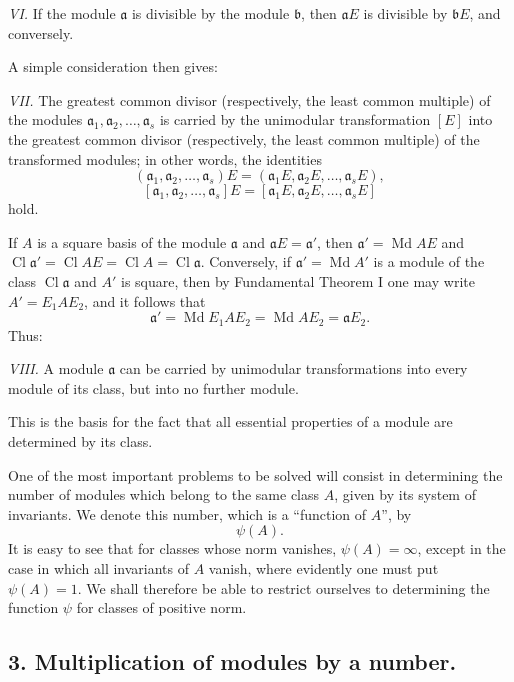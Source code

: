\documentclass[11pt,a4paper]{article}
\newcommand{\Cl}{\operatorname{Cl}}
\newcommand{\Md}{\operatorname{Md}}
\begin{document}
\emph{VI.} If the module $\mathfrak a$ is divisible by the module $\mathfrak b$, then $\mathfrak aE$ is divisible by $\mathfrak bE$, and conversely.

A simple consideration then gives:

\emph{VII.} The greatest common divisor (respectively, the least common multiple) of the modules $\mathfrak a_1,\mathfrak a_2,\ldots,\mathfrak a_s$ is carried by the unimodular transformation $[E]$ into the greatest common divisor (respectively, the least common multiple) of the transformed modules; in other words, the identities
\[
 (\mathfrak a_1,\mathfrak a_2,\ldots,\mathfrak a_s)E
 =(\mathfrak a_1E,\mathfrak a_2E,\ldots,\mathfrak a_sE),
\]
\[
 [\mathfrak a_1,\mathfrak a_2,\ldots,\mathfrak a_s]E
 =[\mathfrak a_1E,\mathfrak a_2E,\ldots,\mathfrak a_sE]
\]
hold.

If $A$ is a square basis of the module $\mathfrak a$ and $\mathfrak aE=\mathfrak a'$, then $\mathfrak a'=\Md AE$ and $\Cl\mathfrak a'=\Cl AE=\Cl A=\Cl\mathfrak a$. Conversely, if $\mathfrak a'=\Md A'$ is a module of the class $\Cl\mathfrak a$ and $A'$ is square, then by Fundamental Theorem I one may write $A'=E_1AE_2$, and it follows that
\[
 \mathfrak a'=\Md E_1AE_2=\Md AE_2=\mathfrak aE_2.
\]
Thus:

\emph{VIII.} A module $\mathfrak a$ can be carried by unimodular transformations into every module of its class, but into no further module.

This is the basis for the fact that all essential properties of a module are determined by its class.

One of the most important problems to be solved will consist in determining the number of modules which belong to the same class $A$, given by its system of invariants. We denote this number, which is a ``function of $A$'', by
\[
 \psi(A).
\]
It is easy to see that for classes whose norm vanishes, $\psi(A)=\infty$, except in the case in which all invariants of $A$ vanish, where evidently one must put $\psi(A)=1$. We shall therefore be able to restrict ourselves to determining the function $\psi$ for classes of positive norm.

\subsection*{3. Multiplication of modules by a number.}
\end{document}
